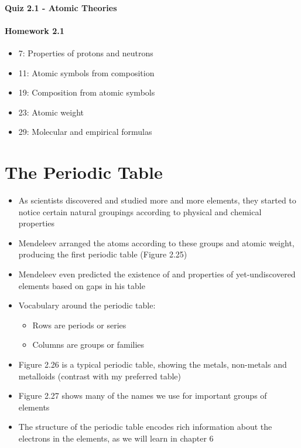 \documentclass[12pt, openany, letterpaper]{memoir}
\begin{document}
\paragraph*{Quiz 2.1 - Atomic Theories}
\paragraph*{Homework 2.1}
\begin{itemize}
  \item 7: Properties of protons and neutrons
  \item 11: Atomic symbols from composition
  \item 19: Composition from atomic symbols
  \item 23: Atomic weight
  \item 29: Molecular and empirical formulas
\end{itemize}

\section{The Periodic Table}
\begin{itemize}
  \item As scientists discovered and studied more and more elements, they started to notice certain natural groupings according to physical and chemical properties
  \item Mendeleev arranged the atoms according to these groups and atomic weight, producing the first periodic table (Figure 2.25)
  \item Mendeleev even predicted the existence of and properties of yet-undiscovered elements based on gaps in his table
  \item Vocabulary around the periodic table:
  \begin{itemize}
    \item Rows are periods or series
    \item Columns are groups or families
  \end{itemize}
  \item Figure 2.26 is a typical periodic table, showing the metals, non-metals and metalloids (contrast with my preferred table)
  \item Figure 2.27 shows many of the names we use for important groups of elements
  \item The structure of the periodic table encodes rich information about the electrons in the elements, as we will learn in chapter 6
\end{itemize}
\end{document}
